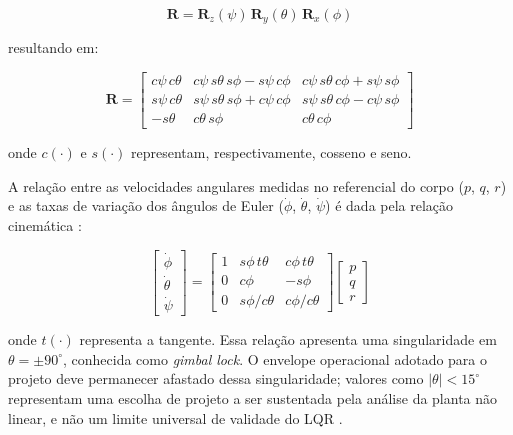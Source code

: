 \begin{equation}\label{eq:rotacao}
\mathbf{R} = \mathbf{R}_z(\psi)\,\mathbf{R}_y(\theta)\,\mathbf{R}_x(\phi)
\end{equation}

\noindent resultando em:

\begin{equation}\label{eq:matriz_rotacao}
\mathbf{R} = \begin{bmatrix}
c\psi\, c\theta & c\psi\, s\theta\, s\phi - s\psi\, c\phi & c\psi\, s\theta\, c\phi + s\psi\, s\phi \\
s\psi\, c\theta & s\psi\, s\theta\, s\phi + c\psi\, c\phi & s\psi\, s\theta\, c\phi - c\psi\, s\phi \\
-s\theta & c\theta\, s\phi & c\theta\, c\phi
\end{bmatrix}
\end{equation}

\noindent onde $c(\cdot)$ e $s(\cdot)$ representam, respectivamente, cosseno e seno.

A relação entre as velocidades angulares medidas no referencial do corpo ($p$, $q$, $r$) e as taxas de variação dos ângulos de Euler ($\dot{\phi}$, $\dot{\theta}$, $\dot{\psi}$) é dada pela relação cinemática \cite{beard2012}:

\begin{equation}\label{eq:euler_rates}
\begin{bmatrix} \dot{\phi} \\ \dot{\theta} \\ \dot{\psi} \end{bmatrix} = \begin{bmatrix}
1 & s\phi\, t\theta & c\phi\, t\theta \\
0 & c\phi & -s\phi \\
0 & s\phi / c\theta & c\phi / c\theta
\end{bmatrix}
\begin{bmatrix} p \\ q \\ r \end{bmatrix}
\end{equation}

\noindent onde $t(\cdot)$ representa a tangente. Essa relação apresenta uma singularidade em $\theta = \pm 90^\circ$, conhecida como \textit{gimbal lock}. O envelope operacional adotado para o projeto deve permanecer afastado dessa singularidade; valores como $|\theta| < 15^\circ$ representam uma escolha de projeto a ser sustentada pela análise da planta não linear, e não um limite universal de validade do LQR \cite{quan2017}.

